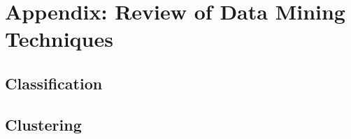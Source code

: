 \section{Appendix: Review of Data Mining Techniques}

\subsection{Classification}

\subsection{Clustering}
